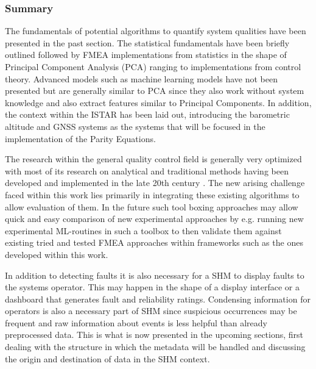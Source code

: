 \subsubsection{Summary}
The fundamentals of potential algorithms to quantify system qualities have been presented in the past section. The statistical fundamentals have been briefly outlined followed by FMEA implementations from statistics in the shape of Principal Component Analysis (PCA) ranging to implementations from control theory. Advanced models such as machine learning models have not been presented but are generally similar to PCA since they also work without system knowledge and also extract features similar to Principal Components. In addition, the context within the ISTAR has been laid out, introducing the barometric altitude and GNSS systems as the systems that will be focused in the implementation of the Parity Equations.



The research within the general quality control field is generally very optimized with most of its research on analytical and traditional methods having been developed and implemented in the late 20th century \cite{isermann_fault-diagnosis_2011}. The new arising challenge faced within this work lies primarily in integrating these existing algorithms to allow evaluation of them. In the future such tool boxing approaches may allow quick and easy comparison of new experimental approaches by e.g. running new experimental ML-routines in such a toolbox to then validate them against existing tried and tested FMEA approaches within frameworks such as the ones developed within this work.

In addition to detecting faults it is also necessary for a SHM to display faults to the systems operator. This may happen in the shape of a display interface or a dashboard that generates fault and reliability ratings. Condensing information for operators is also a necessary part of SHM since suspicious occurrences may be frequent and raw information about events is less helpful than already preprocessed data. This is what is now presented in the upcoming sections, first dealing with the structure in which the metadata will be handled and discussing the origin and destination of data in the SHM context.

